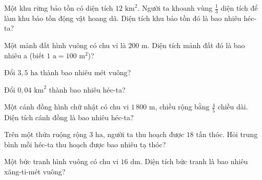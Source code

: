 \begin{ex}
  Một khu rừng bảo tồn có diện tích $12\text{ km}^2$. Người ta khoanh vùng $\frac{1}{3}$ diện tích để làm khu bảo tồn động vật hoang dã. Diện tích khu bảo tồn đó là bao nhiêu héc-ta?
\end{ex}

\begin{ex}
  Một mảnh đất hình vuông có chu vi là $200\text{ m}$. Diện tích mảnh đất đó là bao nhiêu a (biết $1\text{ a} = 100\text{ m}^2$)?
\end{ex}

\begin{ex}
  Đổi $3{,}5\text{ ha}$ thành bao nhiêu mét vuông?
\end{ex}

\begin{ex}
  Đổi $0{,}04\text{ km}^2$ thành bao nhiêu héc-ta?
\end{ex}

\begin{ex}
  Một cánh đồng hình chữ nhật có chu vi $1\,800\text{ m}$, chiều rộng bằng $\frac{4}{5}$ chiều dài. Diện tích cánh đồng là bao nhiêu héc-ta?
\end{ex}

\begin{ex}
  Trên một thửa ruộng rộng $3\text{ ha}$, người ta thu hoạch được $18\text{ tấn}$ thóc. Hỏi trung bình mỗi héc-ta thu hoạch được bao nhiêu tạ thóc?
\end{ex}

\begin{ex}
  Một bức tranh hình vuông có chu vi $16\text{ dm}$. Diện tích bức tranh là bao nhiêu xăng-ti-mét vuông?
\end{ex}


